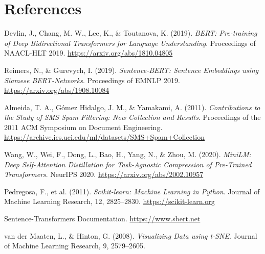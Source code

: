 \documentclass[12pt,a4paper]{article}
\begin{document}
\section{References}

\begin{enumerate}[label={[\arabic*]}]
    \item Devlin, J., Chang, M. W., Lee, K., \& Toutanova, K. (2019). \textit{BERT: Pre-training of Deep Bidirectional Transformers for Language Understanding}. Proceedings of NAACL-HLT 2019. \url{https://arxiv.org/abs/1810.04805}

    \item Reimers, N., \& Gurevych, I. (2019). \textit{Sentence-BERT: Sentence Embeddings using Siamese BERT-Networks}. Proceedings of EMNLP 2019. \url{https://arxiv.org/abs/1908.10084}

    \item Almeida, T. A., G\'{o}mez Hidalgo, J. M., \& Yamakami, A. (2011). \textit{Contributions to the Study of SMS Spam Filtering: New Collection and Results}. Proceedings of the 2011 ACM Symposium on Document Engineering. \url{https://archive.ics.uci.edu/ml/datasets/SMS+Spam+Collection}

    \item Wang, W., Wei, F., Dong, L., Bao, H., Yang, N., \& Zhou, M. (2020). \textit{MiniLM: Deep Self-Attention Distillation for Task-Agnostic Compression of Pre-Trained Transformers}. NeurIPS 2020. \url{https://arxiv.org/abs/2002.10957}

    \item Pedregosa, F., et al. (2011). \textit{Scikit-learn: Machine Learning in Python}. Journal of Machine Learning Research, 12, 2825--2830. \url{https://scikit-learn.org}

    \item Sentence-Transformers Documentation. \url{https://www.sbert.net}

    \item van der Maaten, L., \& Hinton, G. (2008). \textit{Visualizing Data using t-SNE}. Journal of Machine Learning Research, 9, 2579--2605.
\end{enumerate}
\end{document}
